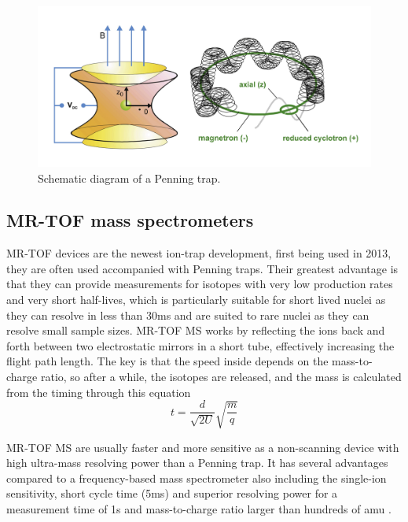 \begin{figure}[H]
    \centering
    \includegraphics[width=.4\textwidth]{images/MS_penningtrap.png}
    \caption{Schematic diagram of a Penning trap.}\label{fig:MS_PT}
\end{figure}

\subsection{MR-TOF mass spectrometers}
MR-TOF devices are the newest ion-trap development, first being used in 2013, they are often used accompanied with Penning traps.
Their greatest advantage is that they can provide measurements for isotopes with very low production rates and very short half-lives, which is particularly suitable for short lived nuclei as they can resolve in less than 30ms and are suited to rare nuclei as they can resolve small sample sizes.
MR-TOF MS works by reflecting the ions back and forth between two electrostatic mirrors in a short tube, effectively increasing the flight path length.
The key is that the speed inside depends on the mass-to-charge ratio, so after a while, the isotopes are released, and the mass is calculated from the timing through this equation
\begin{equation}
    t = \frac{d}{\sqrt{2U}}\sqrt{\frac{m}{q}}
\end{equation}

MR-TOF MS are usually faster and more sensitive as a non-scanning device with high ultra-mass resolving power than a Penning trap.
It has several advantages compared to a frequency-based mass spectrometer also including the single-ion sensitivity, short cycle time (5ms) and superior resolving power for a measurement time of 1s and mass-to-charge ratio larger than hundreds of amu \cite{dickel_multiple-reflection_2013}.
